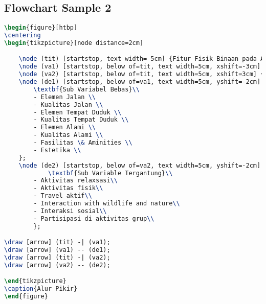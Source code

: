 \documentclass{article}
\begin{document}
\subsection{Flowchart Sample 2 }

\begin{lstlisting}[language=TeX, caption=Flowchart sample 2]
\begin{figure}[htbp]
\centering
\begin{tikzpicture}[node distance=2cm]

	\node (tit) [startstop, text width= 5cm] {Fitur Fisik Binaan pada Aktivitas Luar Jl. Pinggir Laut};
	\node (va1) [startstop, below of=tit, text width=5cm, xshift=-3cm] {Variabel Bebas\\ Fitur Fisik Binaan};
	\node (va2) [startstop, below of=tit, text width=5cm, xshift=3cm] {Variabel Tergantung\\ Aktivitas Luar};
	\node (de1) [startstop, below of=va1, text width=5cm, yshift=-2cm] {
		\textbf{Sub Variabel Bebas}\\
		- Elemen Jalan \\
		- Kualitas Jalan \\
		- Elemen Tempat Duduk \\
		- Kualitas Tempat Duduk \\
		- Elemen Alami \\
		- Kualitas Alami \\
		- Fasilitas \& Aminities \\
		- Estetika \\
	};
	\node (de2) [startstop, below of=va2, text width=5cm, yshift=-2cm] {
			\textbf{Sub Variable Tergantung}\\
		- Aktivitas relaxsasi\\
		- Aktivitas fisik\\
		- Travel aktif\\
		- Interaction with wildlife and nature\\
		- Interaksi sosial\\
		- Partisipasi di aktivitas grup\\
		};

\draw [arrow] (tit) -| (va1);
\draw [arrow] (va1) -- (de1);
\draw [arrow] (tit) -| (va2);
\draw [arrow] (va2) -- (de2);

\end{tikzpicture}
\caption{Alur Pikir}
\end{figure}
\end{lstlisting}
\end{document}
